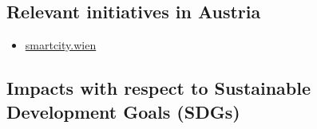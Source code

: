 \documentclass[
]{book}
\providecommand{\tightlist}{%
  \setlength{\itemsep}{0pt}\setlength{\parskip}{0pt}}
\begin{document}
\hypertarget{relevant-initiatives-in-austria-3}{%
\subsection*{Relevant initiatives in Austria}\label{relevant-initiatives-in-austria-3}}

\begin{itemize}
\tightlist
\item
  \href{https://smartcity.wien.gv.at/site/en/smart-inspection/}{smartcity.wien}
\end{itemize}

\hypertarget{impacts-with-respect-to-sustainable-development-goals-sdgs-3}{%
\subsection*{Impacts with respect to Sustainable Development Goals (SDGs)}\label{impacts-with-respect-to-sustainable-development-goals-sdgs-3}}
\end{document}

